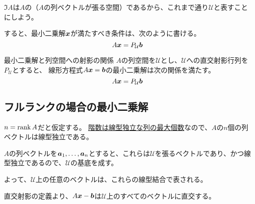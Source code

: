 \documentclass[../../../topic_linear-algebra]{subfiles}
\begin{document}
\br

$\Im A$は$A$の（$A$の列ベクトルが張る空間）であるから、これまで通り$\mathcal{U}$と表すことにしよう。

すると、最小二乗解$\vb*{x}$が満たすべき条件は、次のように書ける。
\begin{equation*}
  A\vb*{x} = P_{\mathcal{U}}\vb*{b}
\end{equation*}

\begin{theorem}{最小二乗解と列空間への射影の関係}\label{thm:least-squares-projection}
  $A$の列空間を$\mathcal{U}$とし、$\mathcal{U}$への直交射影行列を$P_{\mathcal{U}}$とすると、
  線形方程式$A\vb*{x} = \vb*{b}$の最小二乗解は次の関係を満たす。
  \begin{equation*}
    A\vb*{x} = P_{\mathcal{U}}\vb*{b}
  \end{equation*}
\end{theorem}

\subsection{フルランクの場合の最小二乗解}

$n = \rank A$だと仮定する。
\hyperref[thm:rank-equals-max-indep-cols]{階数は線型独立な列の最大個数}なので、$A$の$n$個の列ベクトルは線型独立である。

\br

$A$の列ベクトルを$\vb*{a}_1, \ldots, \vb*{a}_n$とすると、これらは$\mathcal{U}$を張るベクトルであり、かつ線型独立であるので、$\mathcal{U}$の基底を成す。

よって、$\mathcal{U}$上の任意のベクトルは、これらの線型結合で表される。

\br

直交射影の定義より、$A\vb*{x} - \vb*{b}$は$\mathcal{U}$上のすべてのベクトルに直交する。

\br
\end{document}
